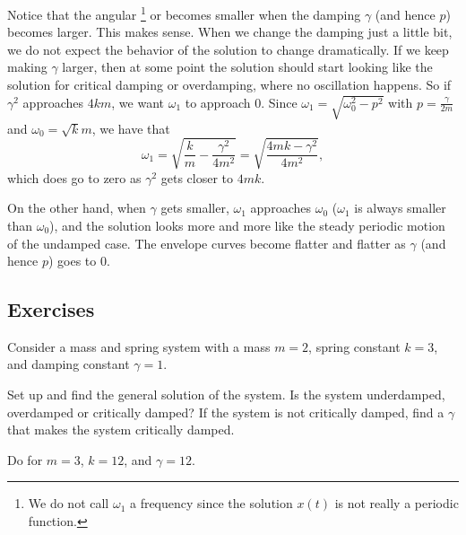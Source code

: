 Notice that the angular
\emph{}\footnote{We do not call $\omega_1$ a frequency
since the solution $x(t)$ is not really a periodic function.} or \emph{} becomes
smaller when the damping $\gamma$ (and hence $p$) becomes larger.  This makes sense.
When we change the damping just a little bit, we do not
expect the behavior of the solution to change dramatically.
If we keep making $\gamma$ larger, then
at some point the solution should start looking 
like the solution for critical damping or overdamping, where no oscillation
happens.  So if $\gamma^2$ approaches $4km$, we want $\omega_1$ to approach 0. Since $\omega_1 = \sqrt{\omega_0^2 - p^2}$ with $p = \frac{\gamma}{2m}$ and $\omega_0 = \sqrt{k}{m}$, we have that
\begin{equation*}
\omega_1 = \sqrt{\frac{k}{m} - \frac{\gamma^2}{4m^2}} = \sqrt{\frac{4mk - \gamma^2}{4m^2}},
\end{equation*}
which does go to zero as $\gamma^2$ gets closer to $4mk$. 


On the other hand, when $\gamma$ gets smaller, $\omega_1$ approaches $\omega_0$
($\omega_1$ is always smaller than $\omega_0$), and the solution looks more and more like the steady
periodic motion of the undamped case.  The envelope curves become flatter and
flatter as $\gamma$ (and hence $p$) goes to 0.

\subsection{Exercises}

\begin{samepage}
\begin{exercise} \label{mv:ex1}
Consider a mass and spring system with a mass $m=2$, spring constant $k=3$, and
damping constant $\gamma=1$.
\begin{tasks}
\task Set up and find the general solution of the system.
\task Is the system underdamped, overdamped or critically damped?
\task If the system is not critically damped, find a $\gamma$ that makes the system
critically damped.
\end{tasks}
\end{exercise}
\end{samepage}

\begin{exercise}
Do  for
$m=3$, $k=12$, and $\gamma=12$.
\end{exercise}

